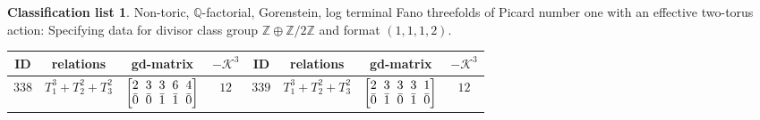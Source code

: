 \documentclass[10pt,a4paper]{amsart}
\theoremstyle{definition}
\newtheorem{class-list}[thm]{Classification list}
\def\ZZ{{\mathbb Z}}
\def\QQ{{\mathbb Q}}
\numberwithin{equation}{section}
\begin{document}
\begin{class-list}
Non-toric, $\QQ$-factorial, Gorenstein, log terminal Fano
threefolds of Picard number one with an effective two-torus action:
Specifying data for divisor class group $\ZZ\oplus \ZZ/2\ZZ$ and format $(1,1,1,2)$.
\begin{table}[h!]\centering\setlength{\tabcolsep}{3.5pt}
\renewcommand{\arraystretch}{1.15}\small\tabulinesep=1mm
\begin{tabu}{c|c|c|c||c|c|c|c}
\hline
ID&relations&gd-matrix&$-\mathcal{K}^3$&ID&relations&gd-matrix&$-\mathcal{K}^3$
\\
\hline
${338}$&${T_{1}^{3}+T_{2}^{2}+T_{3}^{2}}$
&$\arraycolsep=1mm\begin{bmatrix}{2} & {3} & {3} & {6} & {4} \\ {\bar{0}} & {\bar{0}} & {\bar{1}} & {\bar{1}} & {\bar{0}}\end{bmatrix}$&${12}$
&${339}$&${T_{1}^{3}+T_{2}^{2}+T_{3}^{2}}$
&$\arraycolsep=1mm\begin{bmatrix}{2} & {3} & {3} & {3} & {1} \\ {\bar{0}} & {\bar{1}} & {\bar{0}} & {\bar{1}} & {\bar{0}}\end{bmatrix}$&${12}$
\\
\hline
\end{tabu}\vspace{-3mm}
\end{table}
\end{class-list}
\end{document}
